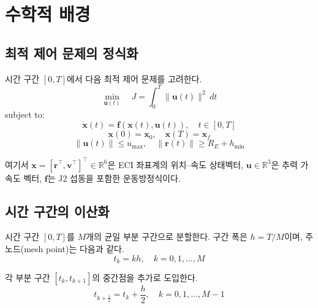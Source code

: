 \documentclass[11pt]{article}
\begin{document}
\section{수학적 배경}
\label{sec:math}

\subsection{최적 제어 문제의 정식화}
\label{sec:ocp}

시간 구간 $[0, T]$에서 다음 최적 제어 문제를 고려한다.
\begin{equation}
\label{eq:cost}
\min_{\mathbf{u}(t)} \quad J = \int_0^T \|\mathbf{u}(t)\|^2 \, dt
\end{equation}
subject to:
\begin{equation}
\label{eq:dynamics}
\dot{\mathbf{x}}(t) = \mathbf{f}(\mathbf{x}(t), \mathbf{u}(t)), \quad t \in [0, T]
\end{equation}
\begin{equation}
\label{eq:bc}
\mathbf{x}(0) = \mathbf{x}_0, \quad \mathbf{x}(T) = \mathbf{x}_f
\end{equation}
\[
\|\mathbf{u}(t)\| \leq u_{\max}, \quad \|\mathbf{r}(t)\| \geq R_E + h_{\min}
\]

여기서 $\mathbf{x} = [\mathbf{r}^\top, \mathbf{v}^\top]^\top \in \mathbb{R}^6$은 ECI 좌표계의 위치--속도 상태벡터, $\mathbf{u} \in \mathbb{R}^3$은 추력 가속도 벡터, $\mathbf{f}$는 J2 섭동을 포함한 운동방정식이다.


\subsection{시간 구간의 이산화}
\label{sec:discretization}

시간 구간 $[0, T]$를 $M$개의 균일 부분 구간으로 분할한다. 구간 폭은 $h = T/M$이며, 주 노드(mesh point)는 다음과 같다.
\[
t_k = k h, \quad k = 0, 1, \ldots, M
\]

각 부분 구간 $[t_k, t_{k+1}]$의 중간점을 추가로 도입한다.
\[
t_{k+\frac{1}{2}} = t_k + \frac{h}{2}, \quad k = 0, 1, \ldots, M - 1
\]
\end{document}
